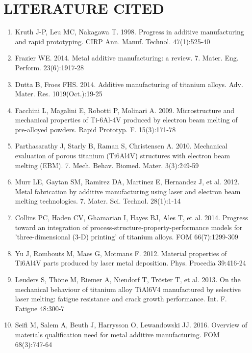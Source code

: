 \documentclass[10pt]{article}
\begin{document}
\section*{LITERATURE CITED}
\begin{enumerate}
  \item Kruth J-P, Leu MC, Nakagawa T. 1998. Progress in additive manufacturing and rapid prototyping. CIRP Ann. Manuf. Technol. 47(1):525-40

  \item Frazier WE. 2014. Metal additive manufacturing: a review. 7. Mater. Eng. Perform. 23(6):1917-28

  \item Dutta B, Froes FHS. 2014. Additive manufacturing of titanium alloys. Adv. Mater. Res. 1019(Oct.):19-25

  \item Facchini L, Magalini E, Robotti P, Molinari A. 2009. Microstructure and mechanical properties of Ti-6Al-4V produced by electron beam melting of pre-alloyed powders. Rapid Prototyp. F. 15(3):171-78

  \item Parthasarathy J, Starly B, Raman S, Christensen A. 2010. Mechanical evaluation of porous titanium (Ti6Al4V) structures with electron beam melting (EBM). 7. Mech. Behav. Biomed. Mater. 3(3):249-59

  \item Murr LE, Gaytan SM, Ramirez DA, Martinez E, Hernandez J, et al. 2012. Metal fabrication by additive manufacturing using laser and electron beam melting technologies. 7. Mater. Sci. Technol. 28(1):1-14

  \item Collins PC, Haden CV, Ghamarian I, Hayes BJ, Ales T, et al. 2014. Progress toward an integration of process-structure-property-performance models for 'three-dimensional (3-D) printing' of titanium alloys. FOM 66(7):1299-309

  \item Yu J, Rombouts M, Maes G, Motmans F. 2012. Material properties of Ti6Al4V parts produced by laser metal deposition. Phys. Procedia 39:416-24

  \item Leuders S, Thöne M, Riemer A, Niendorf T, Tröster T, et al. 2013. On the mechanical behaviour of titanium alloy TiAl6V4 manufactured by selective laser melting: fatigue resistance and crack growth performance. Int. F. Fatigue 48:300-7

  \item Seifi M, Salem A, Beuth J, Harrysson O, Lewandowski JJ. 2016. Overview of materials qualification need for metal additive manufacturing. FOM 68(3):747-64


\end{enumerate}
\end{document}
